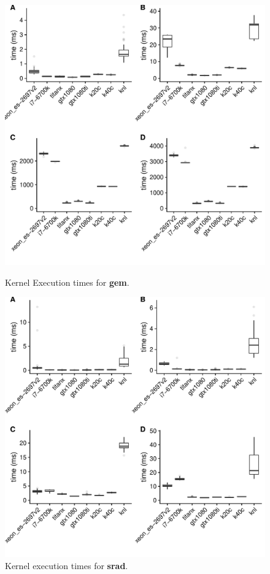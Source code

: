 \documentclass[../document.tex]{subfiles}
\begin{document}
\begin{figure}
\begin{minipage}[b]{.45\textwidth}
\centering
\includegraphics[width=1\textwidth]{figures/time-results/gem.pdf}
\caption{Kernel Execution times for {\bf gem}.}
\label{fig:time-gem}
\end{minipage}
\hfill
\begin{minipage}[b]{.45\textwidth}
\centering
\includegraphics[width=1\textwidth]{figures/time-results/srad.pdf}
\caption{Kernel execution times for {\bf srad}.}
\label{fig:time-srad}
\end{minipage}
\end{figure}
\end{document}
